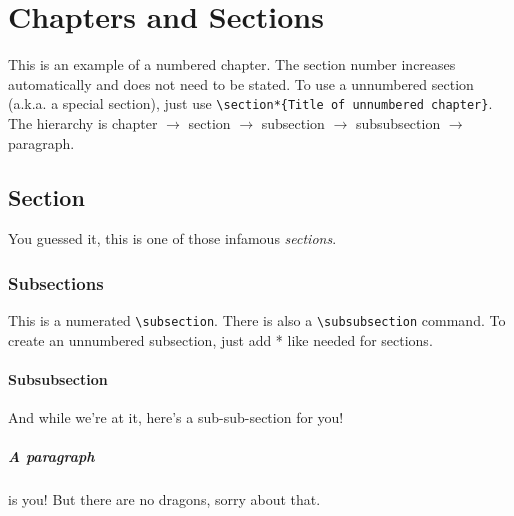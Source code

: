 \chapter{Chapters and Sections}

This is an example of a numbered chapter. The section number increases automatically and does not need to be stated. To use a unnumbered section (a.k.a. a special section), just use \texttt{\textbackslash{}section*\{Title of unnumbered chapter\}}. The hierarchy is chapter $\rightarrow$ section $\rightarrow$ subsection $\rightarrow$ subsubsection $\rightarrow$ paragraph.

\section{Section}

You guessed it, this is one of those infamous \emph{sections}.

\subsection{Subsections}

This is a numerated \texttt{\textbackslash{}subsection}. There is also a \texttt{\textbackslash{}subsubsection} command. To create an unnumbered subsection, just add * like needed for sections.

\subsubsection{Subsubsection}

And while we're at it, here's a sub-sub-section for you!

\paragraph{A paragraph} is you! But there are no dragons, sorry about that.
